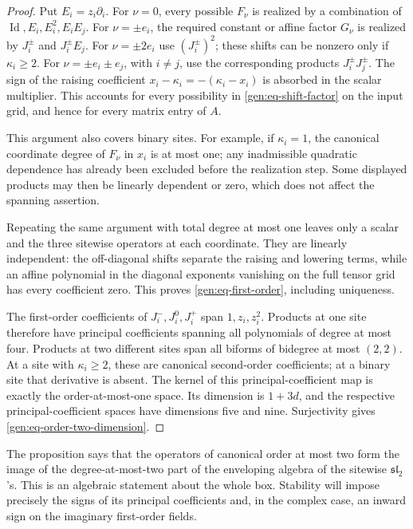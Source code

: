 \documentclass[reqno]{amsart}
\theoremstyle{definition}
\theoremstyle{remark}
\DeclareMathOperator{\Id}{Id}
\begin{document}
\begin{proof}
Put \(E_i=z_i\partial_i\).  For \(\nu=0\), every possible \(F_\nu\)
is realized by a combination of
\(\Id,E_i,E_i^2,E_iE_j\).
For \(\nu=\pm e_i\), the required constant or affine factor \(G_\nu\)
is realized by \(J_i^\pm\) and \(J_i^\pm E_j\).
For \(\nu=\pm2e_i\) use \((J_i^\pm)^2\); these shifts can be nonzero
only if \(\kappa_i\geq2\).
For \(\nu=\pm e_i\pm e_j\), with \(i\neq j\), use the corresponding
products \(J_i^\pm J_j^\pm\).
The sign of the raising coefficient
\(x_i-\kappa_i=-(\kappa_i-x_i)\) is absorbed in the scalar multiplier.
This accounts for every possibility in \eqref{gen:eq-shift-factor}
on the input grid, and hence for every matrix entry of \(A\).

This argument also covers binary sites.  For example, if
\(\kappa_i=1\), the canonical coordinate degree of \(F_\nu\) in
\(x_i\) is at most one; any inadmissible quadratic dependence has
already been excluded before the realization step.
Some displayed products may then be linearly dependent or zero, which
does not affect the spanning assertion.

Repeating the same argument with total degree at most one leaves only
a scalar and the three sitewise operators at each coordinate.
They are linearly independent: the off-diagonal shifts separate the
raising and lowering terms, while an affine polynomial in the diagonal
exponents vanishing on the full tensor grid has every coefficient zero.
This proves \eqref{gen:eq-first-order}, including uniqueness.

The first-order coefficients of \(J_i^-,J_i^0,J_i^+\) span
\(1,z_i,z_i^2\).  Products at one site therefore have principal
coefficients spanning all polynomials of degree at most four.
Products at two different sites span all biforms of bidegree at most
\((2,2)\).  At a site with \(\kappa_i\geq2\), these are canonical
second-order coefficients; at a binary site that derivative is absent.
The kernel of this principal-coefficient map is exactly the
order-at-most-one space.  Its dimension is \(1+3d\), and the respective
principal-coefficient spaces have dimensions five and nine.
Surjectivity gives \eqref{gen:eq-order-two-dimension}.
\end{proof}

The proposition says that the operators of canonical order at most two
form the image of the degree-at-most-two part of the enveloping algebra
of the sitewise \(\mathfrak{sl}_2\)'s.  This is an algebraic statement
about the whole box.  Stability will impose precisely the signs of
its principal coefficients and, in the complex case, an inward sign
on the imaginary first-order fields.
\end{document}
